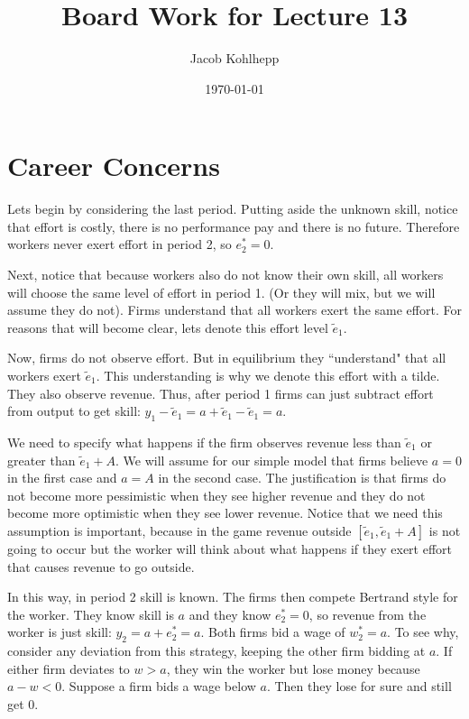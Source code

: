 \documentclass{article}
\title{Board Work for Lecture 13}
\author{Jacob Kohlhepp}
\date{\today}
\begin{document}
\maketitle


\section{Career Concerns}

Lets begin by considering the last period. Putting aside the unknown skill, notice that effort is costly, there is no performance pay and there is no future. Therefore workers never exert effort in period 2, so $e_2^*=0$.

Next, notice that because workers also do not know their own skill, all workers will choose the same level of effort in period 1. (Or they will mix, but we will assume they do not). Firms understand that all workers exert the same effort. For reasons that will become clear, lets denote this effort level $\tilde e_1$.

Now, firms do not observe effort. But in equilibrium they ``understand" that all workers exert $\tilde e_1$. This understanding is why we denote this effort with a tilde. They also observe revenue. Thus, after period 1 firms can just subtract effort from output to get skill: $y_1-\tilde e_1 =a+\tilde e_1 - \tilde e_1=a$.

We need to specify what happens if the firm observes revenue less than $\tilde e_1$ or greater than $\tilde e_1+A$. We will assume for our simple model that firms believe $a=0$ in the first case and $a=A$ in the second case. The justification is that firms do not become more pessimistic when they see higher revenue and they do not become more optimistic when they see lower revenue. Notice that we need this assumption is important, because in the game revenue outside $[\tilde e_1, \tilde e_1+A]$ is not going to occur but the worker will think about what happens if they exert effort that causes revenue to go outside.

In this way, in period 2 skill is known. The firms then compete Bertrand style for the worker. They know skill is $a$ and they know $e_2^*=0$, so revenue from the worker is just skill: $y_2=a+e_2^*=a$. Both firms bid a wage of $w_2^*=a$. To see why, consider any deviation from this strategy, keeping the other firm bidding at $a$. If either firm deviates to $w>a$, they win the worker but lose money because $a-w<0$. Suppose a firm bids a wage below $a$. Then they lose for sure and still get 0.
\end{document}
